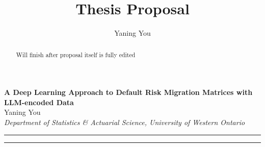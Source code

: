 \documentclass[10pt]{article}
\author{Yaning You}
\title{Thesis Proposal}
\begin{document}
	
	\begin{center}
		{\Large \textbf{A Deep Learning Approach to Default Risk Migration Matrices with LLM-encoded Data}}\\
		\vspace{1em}
		{\large Yaning You}\\
		\vspace{1em}
		\textit{Department of Statistics \& Actuarial Science, University of Western Ontario}
	\end{center}
	

	\begin{center}
		\rule{150mm}{0.2mm}
	\end{center}		

	\begin{abstract}
	
	Will finish after proposal itself is fully edited
	
	\end{abstract}

	\begin{center}
		\rule{150mm}{0.2mm}
	\end{center}		

	\vspace{5mm}
	
\end{document}
